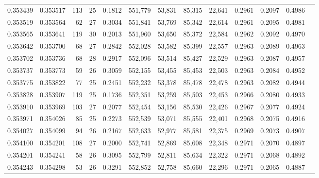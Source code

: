 \begin{tabular}{rrrrrrrrrrrrr}
0.353439 & 0.353517 &   113 &  25 &                                     0.1812 & 551,779 &  53,831 &  85,315 &  22,641 & 0.2961 & 0.2097 & 0.4986 \\
0.353519 & 0.353564 &    62 &  27 &                                     0.3034 & 551,841 &  53,769 &  85,342 &  22,614 & 0.2961 & 0.2095 & 0.4981 \\
0.353565 & 0.353641 &   119 &  30 &                                     0.2013 & 551,960 &  53,650 &  85,372 &  22,584 & 0.2962 & 0.2092 & 0.4970 \\
0.353642 & 0.353700 &    68 &  27 &                                     0.2842 & 552,028 &  53,582 &  85,399 &  22,557 & 0.2963 & 0.2089 & 0.4963 \\
0.353702 & 0.353736 &    68 &  28 &                                     0.2917 & 552,096 &  53,514 &  85,427 &  22,529 & 0.2963 & 0.2087 & 0.4957 \\
0.353737 & 0.353773 &    59 &  26 &                                     0.3059 & 552,155 &  53,455 &  85,453 &  22,503 & 0.2963 & 0.2084 & 0.4952 \\
0.353775 & 0.353822 &    77 &  25 &                                     0.2451 & 552,232 &  53,378 &  85,478 &  22,478 & 0.2963 & 0.2082 & 0.4944 \\
0.353828 & 0.353907 &   119 &  25 &                                     0.1736 & 552,351 &  53,259 &  85,503 &  22,453 & 0.2966 & 0.2080 & 0.4933 \\
0.353910 & 0.353969 &   103 &  27 &                                     0.2077 & 552,454 &  53,156 &  85,530 &  22,426 & 0.2967 & 0.2077 & 0.4924 \\
0.353971 & 0.354026 &    85 &  25 &                                     0.2273 & 552,539 &  53,071 &  85,555 &  22,401 & 0.2968 & 0.2075 & 0.4916 \\
0.354027 & 0.354099 &    94 &  26 &                                     0.2167 & 552,633 &  52,977 &  85,581 &  22,375 & 0.2969 & 0.2073 & 0.4907 \\
0.354100 & 0.354201 &   108 &  27 &                                     0.2000 & 552,741 &  52,869 &  85,608 &  22,348 & 0.2971 & 0.2070 & 0.4897 \\
0.354201 & 0.354241 &    58 &  26 &                                     0.3095 & 552,799 &  52,811 &  85,634 &  22,322 & 0.2971 & 0.2068 & 0.4892 \\
0.354243 & 0.354298 &    53 &  26 &                                     0.3291 & 552,852 &  52,758 &  85,660 &  22,296 & 0.2971 & 0.2065 & 0.4887 \\

\end{tabular}
